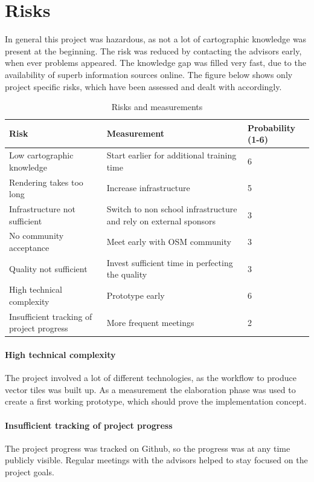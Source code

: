 \section{Risks}\label{risks}
In general this project was hazardous, as not a lot of cartographic knowledge was present at the beginning. The risk was reduced by contacting the advisors early, when ever problems appeared. The knowledge gap was filled very fast, due to the availability of superb information sources online. The figure below shows only project specific risks, which have been assessed and dealt with accordingly.

\begin{table}[H]
\centering
    \begin{tabular}{p{5.5cm} p{6.5cm} p{1.8cm}}
    \hline
    Risk & Measurement & Probability (1-6)\\
    \hline
    Low cartographic knowledge & Start earlier for additional training time & 6\\
    Rendering takes too long & Increase infrastructure & 5\\
    Infrastructure not sufficient & Switch to non school infrastructure and rely on external sponsors & 3\\
    No community acceptance & Meet early with OSM community & 3\\
    Quality not sufficient & Invest sufficient time in perfecting the quality & 3\\
    High technical complexity & Prototype early & 6\\
    Insufficient tracking of project progress & More frequent meetings & 2\\
    \end{tabular}
    \caption{Risks and measurements}
\end{table}

\paragraph{High technical complexity} The project involved a lot of different technologies, as the workflow to produce vector tiles was built up. As a measurement the elaboration phase was used to create a first working prototype, which should prove the implementation concept.

\paragraph{Insufficient tracking of project progress} The project progress was tracked on Github, so the progress was at any time publicly visible.
Regular meetings with the advisors helped to stay focused on the project goals.

